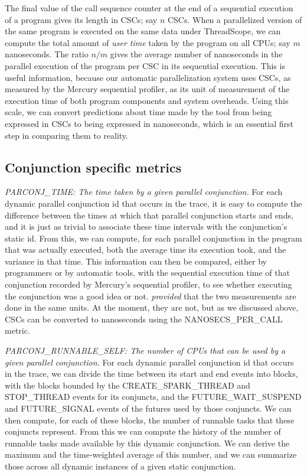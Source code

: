 The final value of the call sequence counter
at the end of a sequential execution of a program 
gives its length in CSCs; say $n$ CSCs.
When a parallelized version of the same program is executed on the same data
under ThreadScope,
we can compute the total amount of \emph{user time}
taken by the program on all CPUs; say $m$ nanoseconds.
The ratio $n/m$ gives the average number of nanoseconds
in the parallel execution of the program
per CSC in its sequential execution.
This is useful information,
because our automatic parallelization system
uses CSCs, as measured by the Mercury sequential profiler,
as its unit of measurement of the execution time 
of both program components and system overheads.
Using this scale, we can convert predictions about time made by the tool
from being expressed in CSCs to being expressed in nanoseconds,
which is an essential first step in comparing them to reality.

\subsection{Conjunction specific metrics}

\emph{PARCONJ\_TIME: The time taken by a given parallel conjunction.}
For each dynamic parallel conjunction id that occurs in the trace,
it is easy to compute the difference between
the times at which that parallel conjunction starts and ends,
and it is just as trivial to associate these time intervals
with the conjunction's static id.
From this, we can compute,
for each parallel conjunction in the program that was actually executed,
both the average time its execution took,
and the variance in that time.
This information can then be compared,
either by programmers or by automatic tools,
with the sequential execution time of that conjunction recorded by
Mercury's sequential profiler,
to see whether executing the conjunction was a good idea or not.
\emph{provided} that the two measurements are done in the same units.
At the moment, they are not, but as we discussed above,
CSCs can be converted to nanoseconds using the NANOSECS\_PER\_CALL metric.

\emph{PARCONJ\_RUNNABLE\_SELF:
The number of CPUs that can be used by a given parallel conjunction.}
For each dynamic parallel conjunction id that occurs in the trace,
we can divide the time between its start and end events into blocks,
with the blocks bounded by
the CREATE\_SPARK\_THREAD and STOP\_THREAD events for its conjuncts,
and the FUTURE\_WAIT\_SUSPEND and FUTURE\_SIGNAL events
of the futures used by those conjuncts.
We can then compute, for each of these blocks,
the number of runnable tasks that these conjuncts represent.
From this we can compute the history of the number
of runnable tasks made available by this dynamic conjunction.
We can derive the maximum and the time-weighted average of this number,
and we can summarize those
across all dynamic instances of a given static conjunction.

